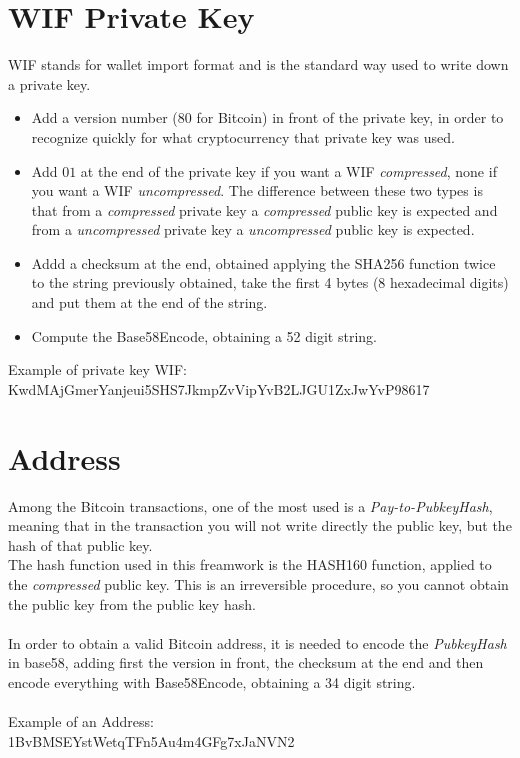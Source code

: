 \section{WIF Private Key}
WIF stands for wallet import format and is the standard way used to write down a private key.
\begin{itemize}
	\item Add a version number ($80$ for Bitcoin) in front of the private key, in order to recognize quickly for what cryptocurrency that private key was used.
	\item Add $01$ at the end of the private key if you want a WIF \textit{compressed}, none if you want a WIF \textit{uncompressed}. The difference between these two types is that from a \textit{compressed} private key a \textit{compressed} public key is expected and from a \textit{uncompressed} private key a \textit{uncompressed} public key is expected.
	\item Addd a checksum at the end, obtained applying the SHA256 function twice to the string previously obtained, take the first 4 bytes (8 hexadecimal digits) and put them at the end of the string.
	\item Compute the Base58Encode, obtaining a 52 digit string.
\end{itemize}
Example of private key WIF: \\ KwdMAjGmerYanjeui5SHS7JkmpZvVipYvB2LJGU1ZxJwYvP98617

\section{Address}
Among the Bitcoin transactions, one of the most used is a \textit{Pay-to-PubkeyHash}, meaning that in the transaction you will not write directly the public key, but the hash of that public key.
\\
The hash function used in this freamwork is the HASH160 function, applied to the \textit{compressed} public key. This is an irreversible procedure, so you cannot obtain the public key from the public key hash. \\ \\
In order to obtain a valid Bitcoin address, it is needed to encode the \textit{PubkeyHash} in base58, adding first the version in front, the checksum at the end and then encode everything with Base58Encode, obtaining a 34 digit string. 
\\ \\
Example of an Address: \\
1BvBMSEYstWetqTFn5Au4m4GFg7xJaNVN2
